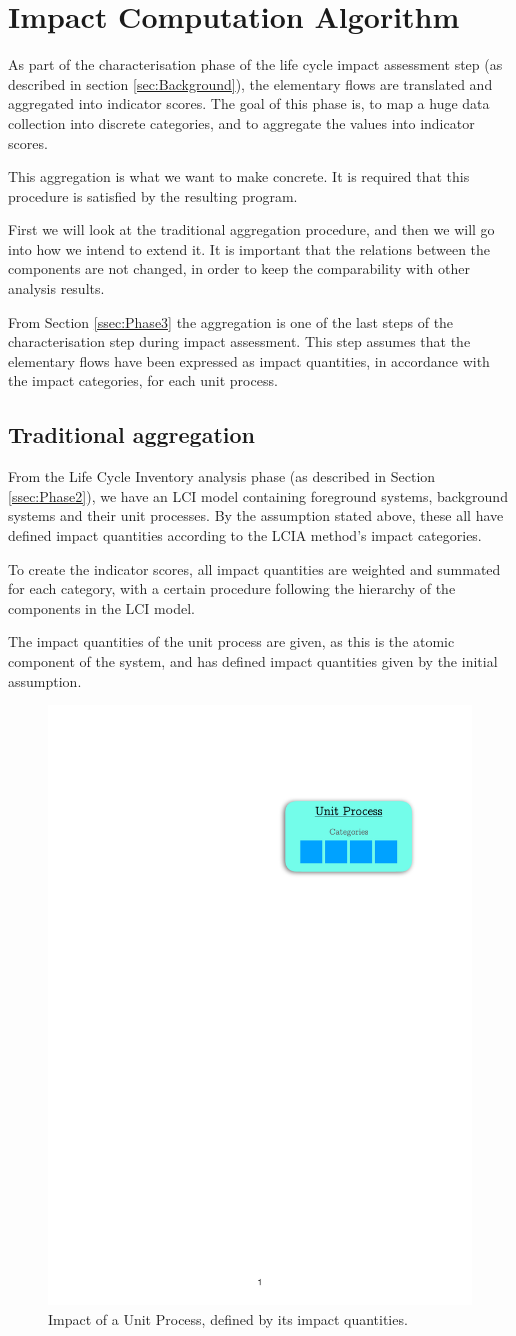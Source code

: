 \section{Impact Computation Algorithm} \label{sec:Requirements-ImpactComputationAlgorithm}

As part of the characterisation phase of the life cycle impact assessment step (as described in section \ref{sec:Background}), the elementary flows are translated and aggregated into indicator scores. The goal of this phase is, to map a huge data collection into discrete categories, and to aggregate the values into indicator scores.

This aggregation is what we want to make concrete. It is required that this procedure is satisfied by the resulting program.

First we will look at the traditional aggregation procedure, and then we will go into how we intend to extend it. It is important that the relations between the components are not changed, in order to keep the comparability with other analysis results.

From Section \ref{ssec:Phase3} the aggregation is one of the last steps of the characterisation step during impact assessment. This step assumes that the elementary flows have been expressed as impact quantities, in accordance with the impact categories, for each unit process.

\subsection{Traditional aggregation}
From the Life Cycle Inventory analysis phase (as described in Section \ref{ssec:Phase2}), we have an LCI model containing foreground systems, background systems and their unit processes. By the assumption stated above, these all have defined impact quantities according to the LCIA method’s impact categories.

To create the indicator scores, all impact quantities are weighted and summated for each category, with a certain procedure following the hierarchy of the components in the LCI model.

The impact quantities of the unit process are given, as this is the atomic component of the system, and has defined impact quantities given by the initial assumption.

\begin{figure}[H]
    \centering
    \includegraphics[page=1, width=0.3\linewidth]{.Figures/ImpactAggregation}
    \caption{Impact of a Unit Process, defined by its impact quantities.}
    \label{fig:UnitProcess-Aggregation}
\end{figure}

